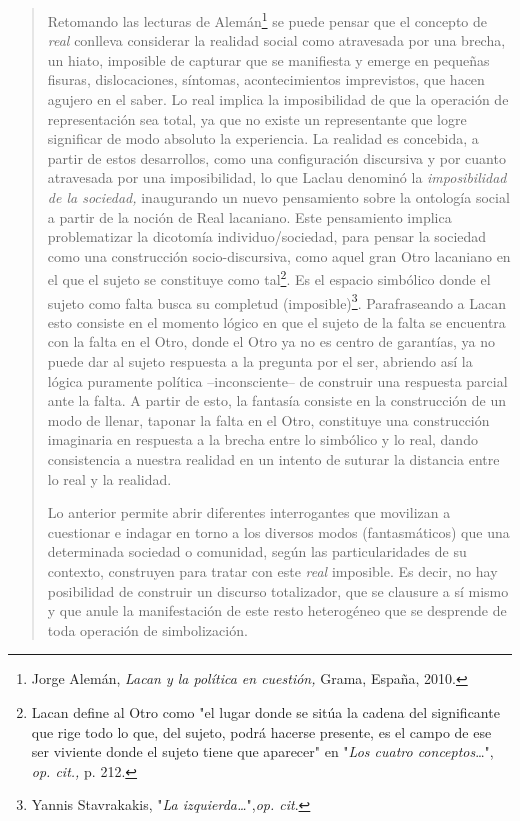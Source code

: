 \begin{quote}
Retomando las lecturas de Alemán\footnote{Jorge Alemán, \emph{Lacan y la
  política en cuestión,} Grama, España, 2010.} se puede pensar que el
concepto de \emph{real} conlleva considerar la realidad social como
atravesada por una brecha, un hiato, imposible de capturar que se
manifiesta y emerge en pequeñas fisuras, dislocaciones, síntomas,
acontecimientos imprevistos, que hacen agujero en el saber. Lo real
implica la imposibilidad de que la operación de representación sea
total, ya que no existe un representante que logre significar de modo
absoluto la experiencia. La realidad es concebida, a partir de estos
desarrollos, como una configuración discursiva y por cuanto atravesada
por una imposibilidad, lo que Laclau denominó la \emph{imposibilidad de
la sociedad,} inaugurando un nuevo pensamiento sobre la ontología social
a partir de la noción de Real lacaniano. Este pensamiento implica
problematizar la dicotomía individuo/sociedad, para pensar la sociedad
como una construcción socio-discursiva, como aquel gran Otro lacaniano
en el que el sujeto se constituye como tal\footnote{Lacan define al Otro
  como "el lugar donde se sitúa la cadena del significante que rige todo
  lo que, del sujeto, podrá hacerse presente, es el campo de ese ser
  viviente donde el sujeto tiene que aparecer" en "\emph{Los cuatro
  conceptos}\ldots", \emph{op. cit.,} p. 212.}. Es el espacio simbólico
donde el sujeto como falta busca su completud (imposible)\footnote{Yannis
  Stavrakakis, "\emph{La izquierda\ldots{}}",\emph{op. cit}.}.
Parafraseando a Lacan esto consiste en el momento lógico en que el
sujeto de la falta se encuentra con la falta en el Otro, donde el Otro
ya no es centro de garantías, ya no puede dar al sujeto respuesta a la
pregunta por el ser, abriendo así la lógica puramente política
--inconsciente-- de construir una respuesta parcial ante la falta. A
partir de esto, la fantasía consiste en la construcción de un modo de
llenar, taponar la falta en el Otro, constituye una construcción
imaginaria en respuesta a la brecha entre lo simbólico y lo real, dando
consistencia a nuestra realidad en un intento de suturar la distancia
entre lo real y la realidad.

Lo anterior permite abrir diferentes interrogantes que movilizan a
cuestionar e indagar en torno a los diversos modos (fantasmáticos) que
una determinada sociedad o comunidad, según las particularidades de su
contexto, construyen para tratar con este \emph{real} imposible. Es
decir, no hay posibilidad de construir un discurso totalizador, que se
clausure a sí mismo y que anule la manifestación de este resto
heterogéneo que se desprende de toda operación de simbolización.


\end{quote}
